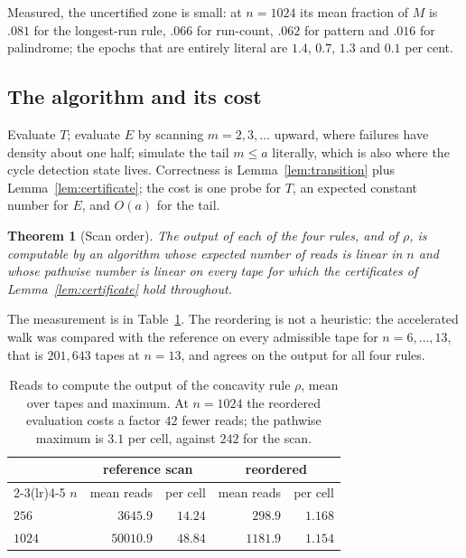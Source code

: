 \documentclass[11pt]{article}
\newtheorem{theorem}{Theorem}
\begin{document}
Measured, the uncertified zone is small: at $n=1024$ its mean fraction of $M$ is $.081$
for the longest-run rule, $.066$ for run-count, $.062$ for pattern and $.016$ for
palindrome; the epochs that are entirely literal are $1.4$, $0.7$, $1.3$ and $0.1$ per
cent.

\subsection{The algorithm and its cost}

Evaluate $T$; evaluate $E$ by scanning $m=2,3,\dots$ upward, where failures have density
about one half; simulate the tail $m\le a$ literally, which is also where the cycle
detection state lives. Correctness is Lemma~\ref{lem:transition} plus
Lemma~\ref{lem:certificate}; the cost is one probe for $T$, an expected constant number
for $E$, and $O(a)$ for the tail.

\begin{theorem}[Scan order]\label{thm:order}
The output of each of the four rules, and of $\rho$, is computable by an algorithm whose
expected number of reads is linear in $n$ and whose pathwise number is linear on every
tape for which the certificates of Lemma~\ref{lem:certificate} hold throughout.
\end{theorem}

The measurement is in Table~\ref{tab:order}. The reordering is not a heuristic: the
accelerated walk was compared with the reference on every admissible tape for
$n=6,\dots,13$, that is $201{,}643$ tapes at $n=13$, and agrees on the output for all four
rules.

\begin{table}[h]
\begin{center}
\begin{tabular}{lrrrr}
\toprule
& \multicolumn{2}{c}{reference scan} & \multicolumn{2}{c}{reordered} \\
\cmidrule(lr){2-3}\cmidrule(lr){4-5}
$n$ & mean reads & per cell & mean reads & per cell \\
\midrule
$256$  & $3645.9$  & $14.24$ & $298.9$  & $1.168$ \\
$1024$ & $50010.9$ & $48.84$ & $1181.9$ & $1.154$ \\
\bottomrule
\end{tabular}
\caption{Reads to compute the output of the concavity rule $\rho$, mean over tapes and
maximum. At $n=1024$ the reordered evaluation costs a factor $42$ fewer reads; the
pathwise maximum is $3.1$ per cell, against $242$ for the scan.}
\label{tab:order}
\end{center}
\end{table}
\end{document}
